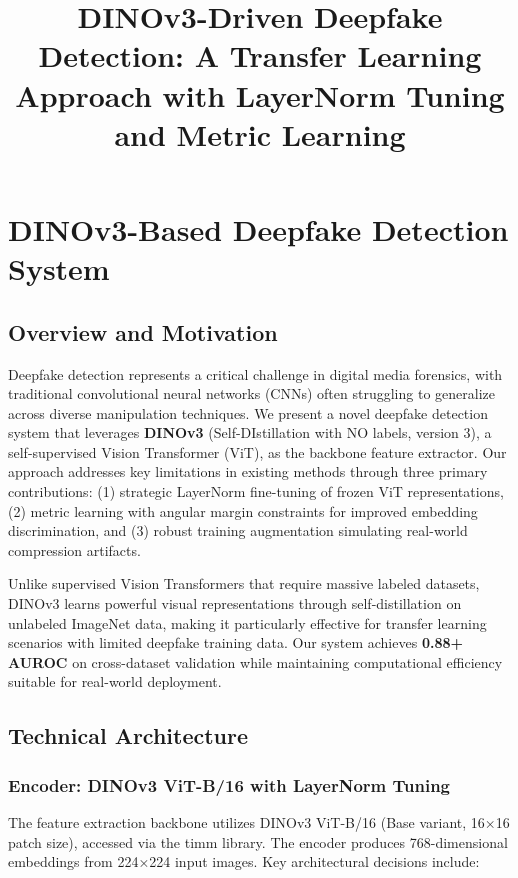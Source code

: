 \documentclass[11pt,a4paper]{article}
\title{DINOv3-Driven Deepfake Detection: A Transfer Learning Approach with LayerNorm Tuning and Metric Learning}
\author{}
\date{}
\begin{document}
\maketitle

\section{DINOv3-Based Deepfake Detection System}

\subsection{Overview and Motivation}

Deepfake detection represents a critical challenge in digital media forensics, with traditional convolutional neural networks (CNNs) often struggling to generalize across diverse manipulation techniques. We present a novel deepfake detection system that leverages \textbf{DINOv3} (Self-DIstillation with NO labels, version 3), a self-supervised Vision Transformer (ViT), as the backbone feature extractor. Our approach addresses key limitations in existing methods through three primary contributions: (1) strategic LayerNorm fine-tuning of frozen ViT representations, (2) metric learning with angular margin constraints for improved embedding discrimination, and (3) robust training augmentation simulating real-world compression artifacts.

Unlike supervised Vision Transformers that require massive labeled datasets, DINOv3 learns powerful visual representations through self-distillation on unlabeled ImageNet data, making it particularly effective for transfer learning scenarios with limited deepfake training data. Our system achieves \textbf{0.88+ AUROC} on cross-dataset validation while maintaining computational efficiency suitable for real-world deployment.

\subsection{Technical Architecture}

\subsubsection{Encoder: DINOv3 ViT-B/16 with LayerNorm Tuning}

The feature extraction backbone utilizes DINOv3 ViT-B/16 (Base variant, 16×16 patch size), accessed via the timm library. The encoder produces 768-dimensional embeddings from 224×224 input images. Key architectural decisions include:
\end{document}
